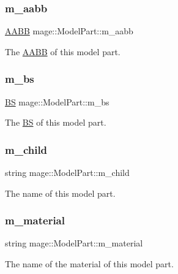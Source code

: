 \subsubsection{\texorpdfstring{m\+\_\+aabb}{m\_aabb}}
{\footnotesize\ttfamily \hyperlink{classmage_1_1_a_a_b_b}{A\+A\+BB} mage\+::\+Model\+Part\+::m\+\_\+aabb}

The \hyperlink{classmage_1_1_a_a_b_b}{A\+A\+BB} of this model part. \hypertarget{structmage_1_1_model_part_a551f6c340fa5547364e6cde9720ad856}{}\label{structmage_1_1_model_part_a551f6c340fa5547364e6cde9720ad856} 
\subsubsection{\texorpdfstring{m\+\_\+bs}{m\_bs}}
{\footnotesize\ttfamily \hyperlink{classmage_1_1_b_s}{BS} mage\+::\+Model\+Part\+::m\+\_\+bs}

The \hyperlink{classmage_1_1_b_s}{BS} of this model part. \hypertarget{structmage_1_1_model_part_abac2e9942c2d8015dc8b4f363729dc45}{}\label{structmage_1_1_model_part_abac2e9942c2d8015dc8b4f363729dc45} 
\subsubsection{\texorpdfstring{m\+\_\+child}{m\_child}}
{\footnotesize\ttfamily string mage\+::\+Model\+Part\+::m\+\_\+child}

The name of this model part. \hypertarget{structmage_1_1_model_part_a606603dd01b895cb1aa91b51089bf27f}{}\label{structmage_1_1_model_part_a606603dd01b895cb1aa91b51089bf27f} 
\subsubsection{\texorpdfstring{m\+\_\+material}{m\_material}}
{\footnotesize\ttfamily string mage\+::\+Model\+Part\+::m\+\_\+material}

The name of the material of this model part. \hypertarget{structmage_1_1_model_part_ad4be9d829693ccb96bb45fc18aa0ede8}{}\label{structmage_1_1_model_part_ad4be9d829693ccb96bb45fc18aa0ede8} 
